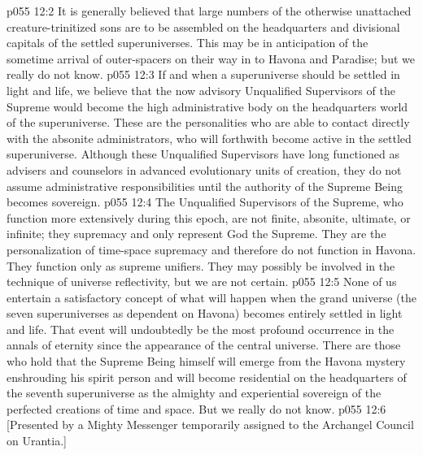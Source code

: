 \vs p055 12:2 It is generally believed that large numbers of the otherwise unattached creature\hyp{}trinitized sons are to be assembled on the headquarters and divisional capitals of the settled superuniverses. This may be in anticipation of the sometime arrival of outer\hyp{}spacers on their way in to Havona and Paradise; but we really do not know.
\pc \vs p055 12:3 If and when a superuniverse should be settled in light and life, we believe that the now advisory Unqualified Supervisors of the Supreme would become the high administrative body on the headquarters world of the superuniverse. These are the personalities who are able to contact directly with the absonite administrators, who will forthwith become active in the settled superuniverse. Although these Unqualified Supervisors have long functioned as advisers and counselors in advanced evolutionary units of creation, they do not assume administrative responsibilities until the authority of the Supreme Being becomes sovereign.
\vs p055 12:4 The Unqualified Supervisors of the Supreme, who function more extensively during this epoch, are not finite, absonite, ultimate, or infinite; they  supremacy and only represent God the Supreme. They are the personalization of time\hyp{}space supremacy and therefore do not function in Havona. They function only as supreme unifiers. They may possibly be involved in the technique of universe reflectivity, but we are not certain.
\pc \vs p055 12:5 None of us entertain a satisfactory concept of what will happen when the grand universe (the seven superuniverses as dependent on Havona) becomes entirely settled in light and life. That event will undoubtedly be the most profound occurrence in the annals of eternity since the appearance of the central universe. There are those who hold that the Supreme Being himself will emerge from the Havona mystery enshrouding his spirit person and will become residential on the headquarters of the seventh superuniverse as the almighty and experiential sovereign of the perfected creations of time and space. But we really do not know.
\vsetoff
\vs p055 12:6 [Presented by a Mighty Messenger temporarily assigned to the Archangel Council on Urantia.]
